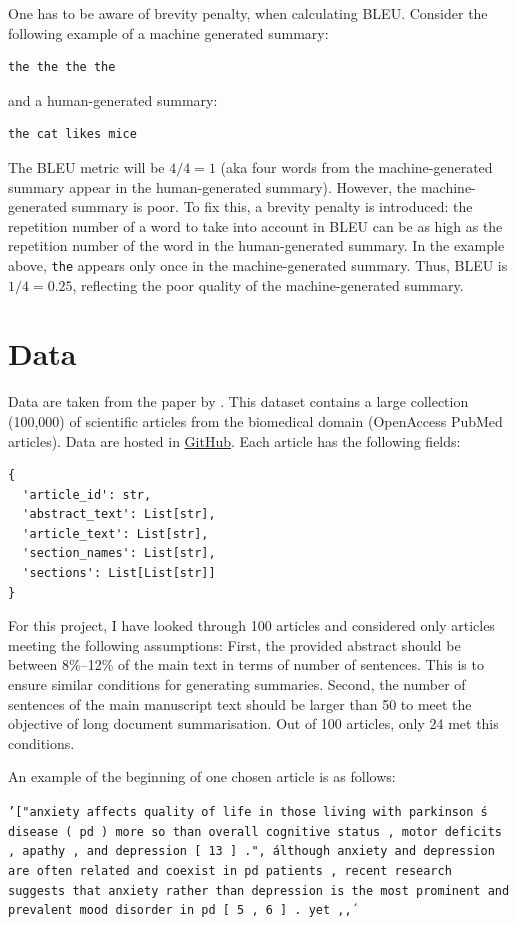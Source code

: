 \documentclass[11pt]{article}
\begin{document}
One has to be aware of brevity penalty, when calculating BLEU. Consider the following example of a machine generated summary: \begin{verbatim}the the the the\end{verbatim} and a human-generated summary: \begin{verbatim}the cat likes mice\end{verbatim} The BLEU metric will be $4/4 = 1$ (aka four words from the machine-generated summary appear in the human-generated summary). However, the machine-generated summary is poor. To fix this, a brevity penalty is introduced: the repetition number of a word to take into account in BLEU can be as high as the repetition number of the word in the human-generated summary. In the example above, \texttt{the} appears only once in the machine-generated summary. Thus, BLEU is $1/4=0.25$, reflecting the poor quality of the machine-generated summary.

\section{Data}
\label{sect:data}

Data are taken from the paper by \citet{cohan2018discourse}. This dataset contains a large collection (100,000) of scientific articles from the biomedical domain (OpenAccess PubMed articles). Data are hosted in \href{https://github.com/armancohan/long-summarization}{GitHub}. Each article has the following fields: 
\begin{verbatim}
{ 
  'article_id': str,
  'abstract_text': List[str],
  'article_text': List[str],
  'section_names': List[str],
  'sections': List[List[str]]
}
\end{verbatim}

For this project, I have looked through 100 articles and considered only articles meeting the following assumptions: First, the provided abstract should be between 8\%--12\% of the main text in terms of number of sentences. This is to ensure similar conditions for generating summaries. Second, the number of sentences of the main manuscript text should be larger than 50 to meet the objective of long document summarisation. Out of 100 articles, only 24 met this conditions.

An example of the beginning of one chosen article is as follows:

\texttt{'["anxiety affects quality of life in those living with parkinson \'s disease ( pd ) more so than overall cognitive status , motor deficits , apathy , and depression [ 13 ] .", \'although anxiety and depression are often related and coexist in pd patients , recent research suggests that anxiety rather than depression is the most prominent and prevalent mood disorder in pd [ 5 , 6 ] . yet ,\', }
\end{document}
